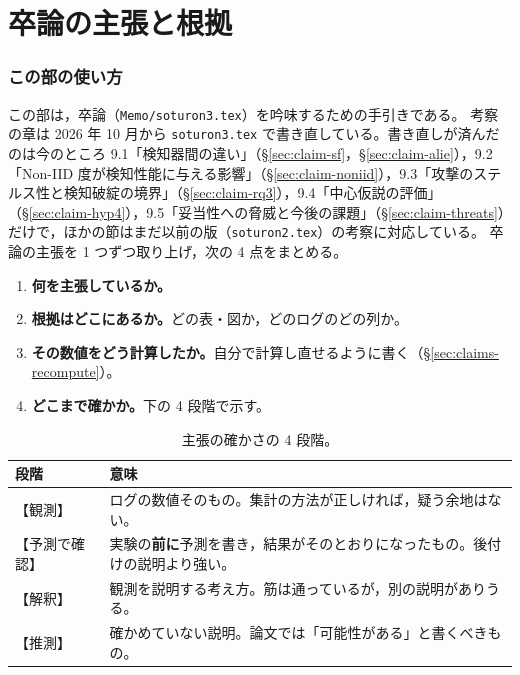 \documentclass[a4j, dvipdfmx]{jsarticle}  %
\begin{document}
\part{卒論の主張と根拠}
\label{part:claims}

\section{この部の使い方}
\label{sec:claims-howto}

この部は，卒論（\texttt{Memo/soturon3.tex}）を吟味するための手引きである。
考察の章は 2026 年 10 月から \texttt{soturon3.tex} で書き直している。書き直しが済んだのは今のところ 9.1「検知器間の違い」（\S\ref{sec:claim-sf}，\S\ref{sec:claim-alie}），9.2「Non-IID 度が検知性能に与える影響」（\S\ref{sec:claim-noniid}），9.3「攻撃のステルス性と検知破綻の境界」（\S\ref{sec:claim-rq3}），9.4「中心仮説の評価」（\S\ref{sec:claim-hyp4}），9.5「妥当性への脅威と今後の課題」（\S\ref{sec:claim-threats}）だけで，ほかの節はまだ以前の版（\texttt{soturon2.tex}）の考察に対応している。
卒論の主張を 1 つずつ取り上げ，次の 4 点をまとめる。
\begin{enumerate}
  \item \textbf{何を主張しているか。}
  \item \textbf{根拠はどこにあるか。}どの表・図か，どのログのどの列か。
  \item \textbf{その数値をどう計算したか。}自分で計算し直せるように書く（\S\ref{sec:claims-recompute}）。
  \item \textbf{どこまで確かか。}下の 4 段階で示す。
\end{enumerate}

\begin{table}[H]
\centering
\caption{主張の確かさの 4 段階。}
\label{tab:certainty}
\begin{tabular}{@{}P{3.4cm} P{11.9cm}@{}}
\toprule
段階 & 意味 \\
\midrule
【観測】 & ログの数値そのもの。集計の方法が正しければ，疑う余地はない。 \\
【予測で確認】 & 実験の\textbf{前に}予測を書き，結果がそのとおりになったもの。後付けの説明より強い。 \\
【解釈】 & 観測を説明する考え方。筋は通っているが，別の説明がありうる。 \\
【推測】 & 確かめていない説明。論文では「可能性がある」と書くべきもの。 \\
\bottomrule
\end{tabular}
\end{table}
\end{document}
